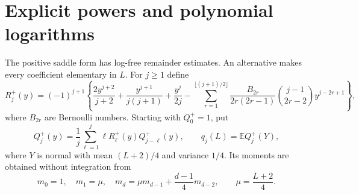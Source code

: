 \documentclass[11pt,letterpaper]{article}
\numberwithin{equation}{section}
\newcommand{\E}{\mathbb E}\newcommand{\ii}{\mathrm i}\newcommand{\M}{\mathcal M}\newcommand{\dd}{\,\mathrm dt}\newcommand{\C}{\mathbb C}
\begin{document}
\section{Explicit powers and polynomial logarithms}
The positive saddle form has log-free remainder estimates. An alternative makes every coefficient elementary in $L$.
For $j\ge1$ define
\begin{equation}\label{sma:eq:Rplus}
 R_j^+(y)=(-1)^{j+1}\left\{
 \frac{2y^{j+2}}{j+2}+\frac{y^{j+1}}{j(j+1)}+\frac{y^j}{2j}
 -\sum_{r=1}^{\lfloor(j+1)/2\rfloor}
 \frac{B_{2r}}{2r(2r-1)}\binom{j-1}{2r-2}y^{j-2r+1}\right\},
\end{equation}
where $B_{2r}$ are Bernoulli numbers. Starting with $Q_0^+=1$, put
\begin{equation}\label{sma:eq:Qplus}
 Q_j^+(y)=\frac1j\sum_{\ell=1}^j\ell R_\ell^+(y)Q_{j-\ell}^+(y),
 \qquad q_j(L)=\E Q_j^+(Y),
\end{equation}
where $Y$ is normal with mean $(L+2)/4$ and variance $1/4$. Its moments are obtained without integration from
\begin{equation}\label{sma:eq:normalrec}
 m_0=1,\quad m_1=\mu,\quad
 m_d=\mu m_{d-1}+\frac{d-1}{4}m_{d-2},\qquad \mu=\frac{L+2}{4}.
\end{equation}
\end{document}
